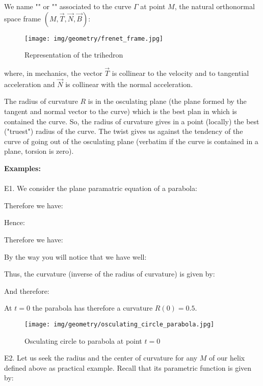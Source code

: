 {	We name "" or "" associated to the curve $\Gamma$ at point $M$, the natural orthonormal space frame $(M,\vec{T},\vec{N},\vec{B})$:
	\begin{figure}[H]
		\centering
		\texttt{[image: img/geometry/frenet\_frame.jpg]}
		\caption{Representation of the trihedron}
	\end{figure}
	where, in mechanics, the vector $\vec{T}$ is collinear to the velocity and to tangential acceleration and $\vec{N}$ is collinear with the normal acceleration.
	\begin{tcolorbox}[title=Remark,colframe=black,arc=10pt]
	The radius of curvature $R$ is in the osculating plane (the plane formed by the tangent and normal vector  to the curve) which is the best plan in which is contained the curve. So, the radius of curvature gives in a point (locally) the best ("truest") radius of the curve. The twist gives us against the tendency of the curve of going out of the osculating plane (verbatim if the curve is contained in a plane, torsion is zero).
	\end{tcolorbox}
	\begin{tcolorbox}[colframe=black,colback=white,sharp corners]
	\textbf{{\Large {}}Examples:}\\\\
	E1. We consider the plane paramatric equation of a parabola:
	
	Therefore we have:
	
	Hence:
	
	\end{tcolorbox}
	
	\begin{tcolorbox}[colframe=black,colback=white,sharp corners]
	Therefore we have:
	
	By the way you will notice that we have well:
	
	Thus, the curvature (inverse of the radius of curvature) is given by:
	
	And therefore:
	
	At $t=0$ the parabola has therefore a curvature $R(0)=0.5$.
	\begin{figure}[H]
		\centering
		\texttt{[image: img/geometry/osculating\_circle\_parabola.jpg]}
		\caption[]{Osculating circle to parabola at point $t=0$}
	\end{figure}
	
	E2. Let us seek the radius and the center of curvature for any $M$ of our helix defined above as practical example. Recall that its parametric function is given by:
	

\end{tcolorbox}}

